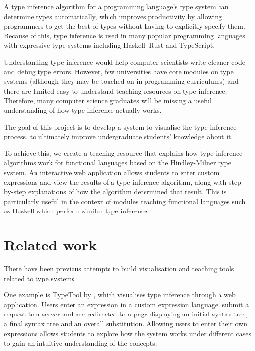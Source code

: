 \documentclass[a4paper,fleqn,oneside,12pt]{report}
\begin{document}
A type inference algorithm for a programming language's type system can determine types automatically, which improves productivity by allowing programmers to get the best of types without having to explicitly specify them. Because of this, type inference is used in many popular programming languages with expressive type systems including Haskell, Rust and TypeScript.

Understanding type inference would help computer scientists write cleaner code and debug type errors. However, few universities have core modules on type systems (although they may be touched on in programming curriculums) and there are limited easy-to-understand teaching resources on type inference. Therefore, many computer science graduates will be missing a useful understanding of how type inference actually works.

The goal of this project is to develop a system to visualise the type inference process, to ultimately improve undergraduate students’ knowledge about it.

To achieve this, we create a teaching resource that explains how type inference algorithms work for functional languages based on the Hindley-Milner type system. An interactive web application allows students to enter custom expressions and view the results of a type inference algorithm, along with step-by-step explanations of how the algorithm determined that result. This is particularly useful in the context of modules teaching functional languages such as Haskell which perform similar type inference.

\section{Related work}\label{id:h.2mwaav7jkal4}

There have been previous attempts to build visualisation and teaching tools related to type systems.

One example is TypeTool by \cite{ref4}, which visualises type inference through a web application. Users enter an expression in a custom expression language, submit a request to a server and are redirected to a page displaying an initial syntax tree, a final syntax tree and an overall substitution. Allowing users to enter their own expressions allows students to explore how the system works under different cases to gain an intuitive understanding of the concepts.
\end{document}
